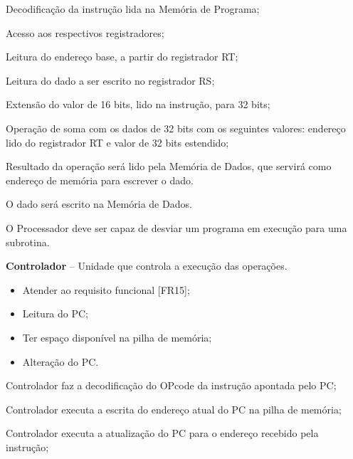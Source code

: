 \documentclass{article}
\begin{document}
  
  \begin{mainflow}
    \item Decodificação da instrução lida na Memória de Programa;
	\item Acesso aos respectivos registradores;
	\item Leitura do endereço base, a partir do registrador RT;
	\item Leitura do dado a ser escrito no registrador RS;
	\item Extensão do valor de 16 bits, lido na instrução, para 32 bits;
	\item Operação de soma com os dados de 32 bits com os seguintes valores: endereço lido do registrador RT e valor de 32 bits estendido;
	\item Resultado da operação será lido pela Memória de Dados, que servirá como endereço de memória para escrever o dado.
	\item O dado será escrito na Memória de Dados.
  \end{mainflow}
  
	O Processador deve ser capaz de desviar um programa em execução para uma subrotina.
	
	\actors
	\begin{description}
		\item \textbf{Controlador} – Unidade que controla a execução das operações.
	\end{description}
	
	\preconditions 
	\begin{itemize}
		\item Atender ao requisito funcional [FR15];
		\item Leitura do PC;
		\item Ter espaço disponível na pilha de memória;
	\end{itemize}
	
	\postconditions
	\begin{itemize}
		\item Alteração do PC.
	\end{itemize}

	\newpage
	
	
	\begin{mainflow}
		\item Controlador faz a  decodificação do OPcode da instrução apontada pelo PC;
		\item Controlador executa a escrita do endereço atual do PC na pilha de memória;
		\item Controlador executa a atualização do PC para o endereço recebido pela instrução;
	\end{mainflow}
  
\end{document}
